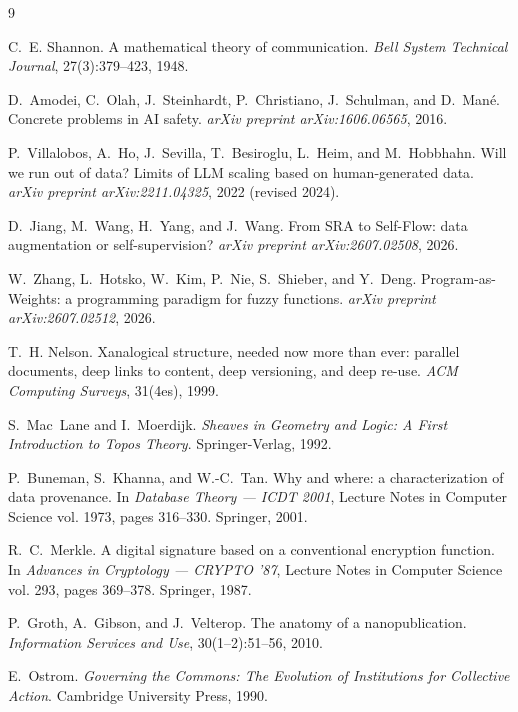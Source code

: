 \documentclass[11pt]{article}
\theoremstyle{definition}
\begin{document}
\begin{thebibliography}{9}

C.~E. Shannon. A mathematical theory of communication. \emph{Bell System Technical Journal}, 27(3):379--423, 1948.

D.~Amodei, C.~Olah, J.~Steinhardt, P.~Christiano, J.~Schulman, and D.~Man\'e. Concrete problems in AI safety. \emph{arXiv preprint arXiv:1606.06565}, 2016.

P.~Villalobos, A.~Ho, J.~Sevilla, T.~Besiroglu, L.~Heim, and M.~Hobbhahn. Will we run out of data? Limits of LLM scaling based on human-generated data. \emph{arXiv preprint arXiv:2211.04325}, 2022 (revised 2024).

D.~Jiang, M.~Wang, H.~Yang, and J.~Wang. From SRA to Self-Flow: data augmentation or self-supervision? \emph{arXiv preprint arXiv:2607.02508}, 2026.

W.~Zhang, L.~Hotsko, W.~Kim, P.~Nie, S.~Shieber, and Y.~Deng. Program-as-Weights: a programming paradigm for fuzzy functions. \emph{arXiv preprint arXiv:2607.02512}, 2026.

T.~H. Nelson. Xanalogical structure, needed now more than ever: parallel documents, deep links to content, deep versioning, and deep re-use. \emph{ACM Computing Surveys}, 31(4es), 1999.

S.~Mac~Lane and I.~Moerdijk. \emph{Sheaves in Geometry and Logic: A First Introduction to Topos Theory}. Springer-Verlag, 1992.

P.~Buneman, S.~Khanna, and W.-C.~Tan. Why and where: a characterization of data provenance. In \emph{Database Theory --- ICDT 2001}, Lecture Notes in Computer Science vol. 1973, pages 316--330. Springer, 2001.

R.~C.~Merkle. A digital signature based on a conventional encryption function. In \emph{Advances in Cryptology --- CRYPTO '87}, Lecture Notes in Computer Science vol. 293, pages 369--378. Springer, 1987.

P.~Groth, A.~Gibson, and J.~Velterop. The anatomy of a nanopublication. \emph{Information Services and Use}, 30(1--2):51--56, 2010.

E.~Ostrom. \emph{Governing the Commons: The Evolution of Institutions for Collective Action}. Cambridge University Press, 1990.

\end{thebibliography}
\end{document}
